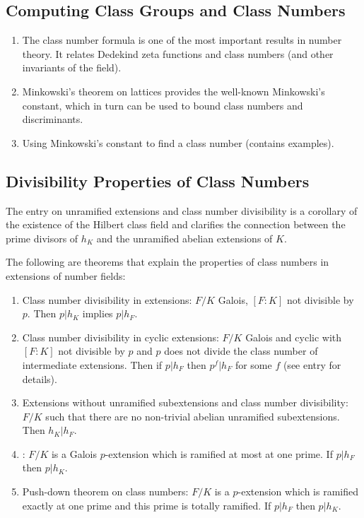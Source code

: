 \documentclass[12pt]{article}
\begin{document}
\subsection{Computing Class Groups and Class Numbers}
\begin{enumerate}
\item The class number formula is one of the most important results in number theory. It relates Dedekind zeta functions and class numbers (and other invariants of the field).

\item Minkowski's theorem on lattices provides the well-known Minkowski's constant, which in turn can be used to bound class numbers and discriminants.

\item Using Minkowski's constant to find a class number (contains examples).
\end{enumerate}

\subsection{Divisibility Properties of Class Numbers}
The entry on unramified extensions and class number divisibility is a corollary of the existence of the Hilbert class field and clarifies the connection between the prime divisors of $h_K$ and the unramified abelian extensions of $K$.

The following are theorems that explain the properties of class numbers in extensions of number fields:
\begin{enumerate}
\item Class number divisibility in extensions: $F/K$ Galois, $[F:K]$ not divisible by $p$. Then $p|h_K$ implies $p|h_F$.
\item Class number divisibility in cyclic extensions: $F/K$ Galois and cyclic with $[F:K]$ not divisible by $p$ and $p$ does not divide the class number of intermediate extensions. Then if $p|h_F$ then $p^f|h_F$ for some $f$ (see entry for details).
\item Extensions without unramified subextensions and class number divisibility: $F/K$ such that there are no non-trivial abelian unramified subextensions. Then $h_K|h_F$. 
\item {}: $F/K$ is a Galois $p$-extension which is ramified at most at one prime. If $p|h_F$ then $p|h_K$.

\item Push-down theorem on class numbers: $F/K$ is a $p$-extension which is ramified exactly at one prime and this prime is totally ramified. If $p|h_F$ then $p|h_K$. 
\end{enumerate}
\end{document}
